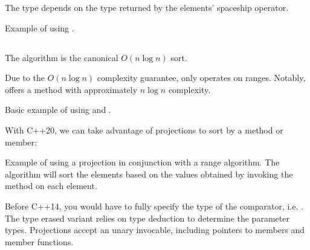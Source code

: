 The type depends on the type returned by the elements' spaceship operator.


\begin{codebox}[]{\href{https://compiler-explorer.com/z/a73njbW4M}{\ExternalLink}}
\footnotesize Example of using .
\tcblower
{}
\end{codebox}

\subsection{\texorpdfstring{}{\texttt{std::sort}}}

The  algorithm is the canonical $O(n\log n)$ sort.


Due to the $O(n\log n)$ complexity guarantee,  only operates on  ranges. Notably,  offers a method with approximately $n\log n$ complexity.

\begin{codebox}[]{\href{https://compiler-explorer.com/z/W9WodGs71}{\ExternalLink}}
\footnotesize Basic example of using  and .
\tcblower
{}
\end{codebox}

With C++20, we can take advantage of projections to sort by a method or member:

\begin{codebox}[breakable]{\href{https://compiler-explorer.com/z/35YK5q15M}{\ExternalLink}}
\footnotesize Example of using a projection in conjunction with a range algorithm. The algorithm will sort the elements based on the values obtained by invoking the method  on each element.
\tcblower
{}
\end{codebox}

Before C++14, you would have to fully specify the type of the comparator, i.e. . The type erased variant  relies on type deduction to determine the parameter types. Projections accept an unary invocable, including pointers to members and member functions.

